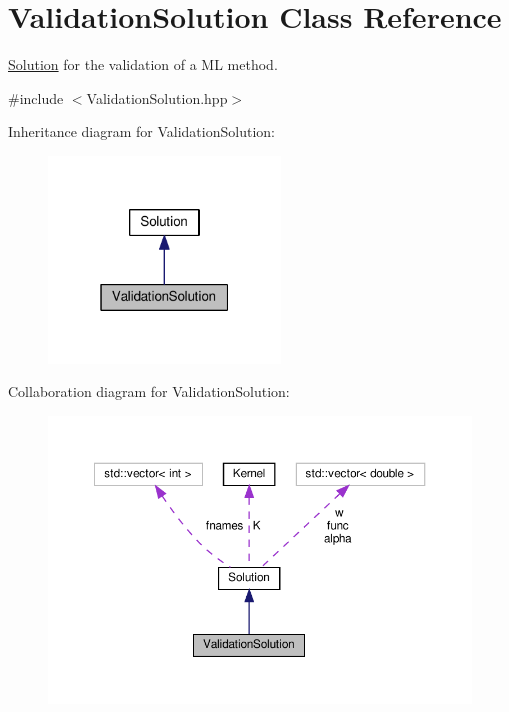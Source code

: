 \hypertarget{class_validation_solution}{}\section{Validation\+Solution Class Reference}
\label{class_validation_solution}


\hyperlink{class_solution}{Solution} for the validation of a ML method.  




{\ttfamily \#include $<$Validation\+Solution.\+hpp$>$}



Inheritance diagram for Validation\+Solution\+:\nopagebreak
\begin{figure}[H]
\begin{center}
\leavevmode
\includegraphics[width=175pt]{class_validation_solution__inherit__graph}
\end{center}
\end{figure}


Collaboration diagram for Validation\+Solution\+:
\nopagebreak
\begin{figure}[H]
\begin{center}
\leavevmode
\includegraphics[width=350pt]{class_validation_solution__coll__graph}
\end{center}
\end{figure}
